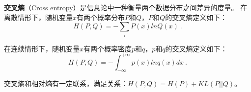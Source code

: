 
\begin{issues}
\issueDraft
\end{issues}

\textbf{交叉熵}（Cross entropy）是信息论中一种衡量两个数据分布之间差异的度量。
在离散情形下，随机变量$x$有两个概率分布$P$和$Q$，$P$和$Q$的交叉熵定义如下：
\begin{equation}
H(P,Q)=-\sum_iP(x)lnQ(x)~.
\end{equation}

在连续情形下，随机变量$x$有两个概率密度$p$和$q$，$p$和$q$的交叉熵定义如下：
\begin{equation}
H(P,Q)=- \int_{-\infty}^{+\infty}p(x)lnq(x)dx~.
\end{equation}

交叉熵和相对熵有一定联系，满足关系：$H(P,Q)=H(P)+KL(P||Q)$。